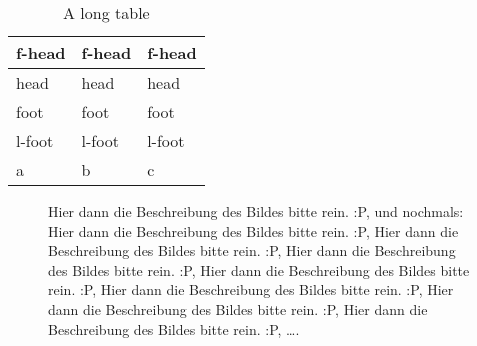 \begin{longtable}{C{0.25\textwidth}Z{p}{0.2\textwidth}{\raggedleft}l}%
	\caption{A long table}\label{tab:introduction:1}\\%
	\toprule%
	f-head & f-head & f-head \\%
	\midrule%
	\endfirsthead%
	\toprule%
	head & head & head \\%
	\midrule%
	\endhead%
	\midrule%
	foot & foot & foot \\%
	\bottomrule%
	\endfoot%
	\midrule%
	l-foot & l-foot & l-foot \\%
	\bottomrule%
	\endlastfoot%
	a&b&c\\%
\end{longtable}%
\begin{figure}%
	\caption[Test 1]{Hier dann die Beschreibung des Bildes bitte rein. :P, und nochmals: Hier dann die Beschreibung des Bildes bitte rein. :P, Hier dann die Beschreibung des Bildes bitte rein. :P, Hier dann die Beschreibung des Bildes bitte rein. :P, Hier dann die Beschreibung des Bildes bitte rein. :P, Hier dann die Beschreibung des Bildes bitte rein. :P, Hier dann die Beschreibung des Bildes bitte rein. :P, Hier dann die Beschreibung des Bildes bitte rein. :P, \ldots{}.}%
	\label{fig:introduction:1}%
\end{figure}%
\newpage%
%

